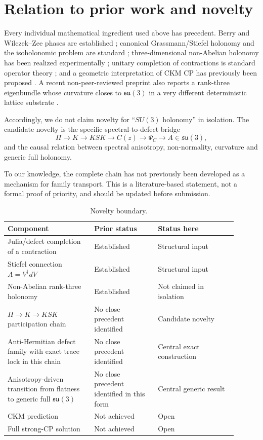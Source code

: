 \documentclass[11pt]{article}
\theoremstyle{remark}\newtheorem{remark}{Remark}
\begin{document}
\section{Relation to prior work and novelty}
Every individual mathematical ingredient used above has precedent. Berry and Wilczek--Zee phases are established \cite{Berry1984,WilczekZee1984}; canonical Grassmann/Stiefel holonomy and the isoholonomic problem are standard \cite{Tanimura2005}; three-dimensional non-Abelian holonomy has been realized experimentally \cite{Neef2023}; unitary completion of contractions is standard operator theory \cite{SzNagy2010,JulaModern2021}; and a geometric interpretation of CKM CP has previously been proposed \cite{Fanchiotti2017}. A recent non-peer-reviewed preprint also reports a rank-three eigenbundle whose curvature closes to $\mathfrak{su}(3)$ in a very different deterministic lattice substrate \cite{Molzberger2026}.

Accordingly, we do not claim novelty for ``$SU(3)$ holonomy'' in isolation. The candidate novelty is the specific spectral-to-defect bridge
\begin{equation}
\Pi\longrightarrow K\longrightarrow KSK\longrightarrow C(z)\longrightarrow \Psi_C\longrightarrow A\in\mathfrak{su}(3),
\end{equation}
and the causal relation between spectral anisotropy, non-normality, curvature and generic full holonomy.

To our knowledge, the complete chain has not previously been developed as a mechanism for family transport. This is a literature-based statement, not a formal proof of priority, and should be updated before submission.

\begin{table}[H]
\centering
\small
\caption{Novelty boundary.}
\begin{tabular}{p{0.34\linewidth}p{0.25\linewidth}p{0.31\linewidth}}
\toprule
Component & Prior status & Status here\\
\midrule
Julia/defect completion of a contraction & Established & Structural input\\
Stiefel connection $A=V^\dagger dV$ & Established & Structural input\\
Non-Abelian rank-three holonomy & Established & Not claimed in isolation\\
$\Pi\to K\to KSK$ participation chain & No close precedent identified & Candidate novelty\\
Anti-Hermitian defect family with exact trace lock in this chain & No close precedent identified & Central exact construction\\
Anisotropy-driven transition from flatness to generic full $\mathfrak{su}(3)$ & No close precedent identified in this form & Central generic result\\
CKM prediction & Not achieved & Open\\
Full strong-CP solution & Not achieved & Open\\
\bottomrule
\end{tabular}
\end{table}
\end{document}

